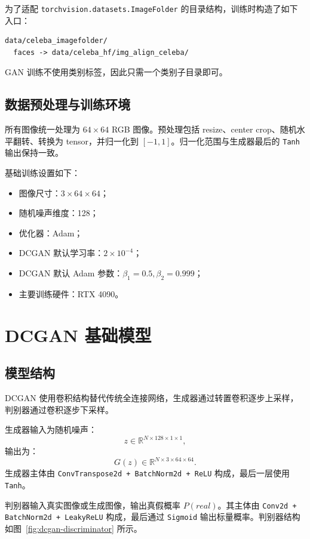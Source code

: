 \documentclass[UTF8,a4paper,12pt]{ctexart}
\begin{document}
为了适配 \texttt{torchvision.datasets.ImageFolder} 的目录结构，训练时构造了如下入口：
\begin{verbatim}
data/celeba_imagefolder/
  faces -> data/celeba_hf/img_align_celeba/
\end{verbatim}
GAN 训练不使用类别标签，因此只需一个类别子目录即可。

\subsection{数据预处理与训练环境}

所有图像统一处理为 $64 \times 64$ RGB 图像。预处理包括 resize、center crop、随机水平翻转、转换为 tensor，并归一化到 $[-1,1]$。归一化范围与生成器最后的 \texttt{Tanh} 输出保持一致。

基础训练设置如下：
\begin{itemize}
    \item 图像尺寸：$3 \times 64 \times 64$；
    \item 随机噪声维度：128；
    \item 优化器：Adam；
    \item DCGAN 默认学习率：$2\times 10^{-4}$；
    \item DCGAN 默认 Adam 参数：$\beta_1=0.5,\beta_2=0.999$；
    \item 主要训练硬件：RTX 4090。
\end{itemize}

\section{DCGAN 基础模型}

\subsection{模型结构}

DCGAN 使用卷积结构替代传统全连接网络，生成器通过转置卷积逐步上采样，判别器通过卷积逐步下采样。

生成器输入为随机噪声：
\begin{equation}
    z \in \mathbb{R}^{N \times 128 \times 1 \times 1},
\end{equation}
输出为：
\begin{equation}
    G(z) \in \mathbb{R}^{N \times 3 \times 64 \times 64}.
\end{equation}
生成器主体由 \texttt{ConvTranspose2d + BatchNorm2d + ReLU} 构成，最后一层使用 \texttt{Tanh}。

判别器输入真实图像或生成图像，输出真假概率 $P(real)$。其主体由 \texttt{Conv2d + BatchNorm2d + LeakyReLU} 构成，最后通过 \texttt{Sigmoid} 输出标量概率。判别器结构如图~\ref{fig:dcgan-discriminator} 所示。
\end{document}
